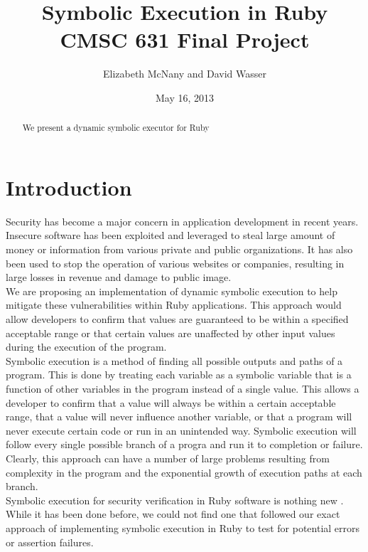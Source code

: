 \documentclass[10pt]{article}
\title{Symbolic Execution in Ruby\\
CMSC 631 Final Project}
\author{Elizabeth McNany and David Wasser}
\date{May 16, 2013}
\begin{document}
\maketitle

\begin{abstract}
We present a dynamic symbolic executor for Ruby
\end{abstract}

\section{Introduction}
Security has become a major concern in application development in recent years.  Insecure software has been exploited and leveraged to steal large amount of money or information from various private and public organizations.  It has also been used to stop the operation of various websites or companies, resulting in large losses in revenue and damage to public image.\\

We are proposing an implementation of dynamic symbolic execution to help mitigate these vulnerabilities within Ruby applications.  This approach would allow developers to confirm that values are guaranteed to be within a specified acceptable range or that certain values are unaffected by other input values during the execution of the program.\\

Symbolic execution is a method of finding all possible outputs and paths of a program.  This is done by treating each variable as a symbolic variable that is a function of other variables in the program instead of a single value.  This allows a developer to confirm that a value will always be within a certain acceptable range, that a value will never influence another variable, or that a program will never execute certain code or run in an unintended way.  Symbolic execution will follow every single possible branch of a progra and run it to completion or failure.  Clearly, this approach can have a number of large problems resulting from complexity in the program and the exponential growth of execution paths at each branch.\\

Symbolic execution for security verification in Ruby software is nothing new \cite{rails}.  While it has been done before, we could not find one that followed our exact approach of implementing symbolic execution in Ruby to test for potential errors or assertion failures.\\
\end{document}
